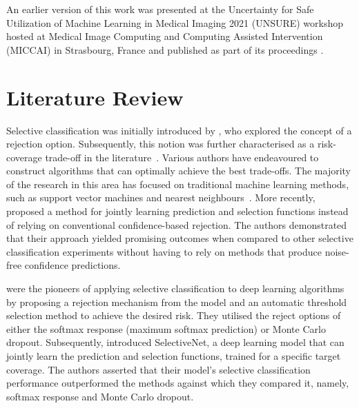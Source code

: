 An earlier version of this work was presented at the Uncertainty for Safe Utilization of Machine Learning in Medical Imaging 2021 (UNSURE) workshop hosted at Medical Image Computing and Computing Assisted Intervention (MICCAI) in Strasbourg, France and published as part of its proceedings \citep{carse2021robust}.



\section{Literature Review}
\label{sec:selective_review}
Selective classification was initially introduced by \cite{chow1957optimum}, who explored the concept of a rejection option. Subsequently, this notion was further characterised as a risk-coverage trade-off in the literature~\citep{el2010foundations}. Various authors have endeavoured to construct algorithms that can optimally achieve the best trade-offs. The majority of the research in this area has focused on traditional machine learning methods, such as support vector machines and nearest neighbours~\citep{hellman1970nearest,fumera2002support,wiener2015agnostic}. More recently, \cite{cortes2016learning} proposed a method for jointly learning prediction and selection functions instead of relying on conventional confidence-based rejection. The authors demonstrated that their approach yielded promising outcomes when compared to other selective classification experiments without having to rely on methods that produce noise-free confidence predictions.

\cite{geifman2017selective} were the pioneers of applying selective classification to deep learning algorithms by proposing a rejection mechanism from the model and an automatic threshold selection method to achieve the desired risk. They utilised the reject options of either the softmax response (maximum softmax prediction) or Monte Carlo dropout. Subsequently, \cite{geifman2019selectivenet} introduced SelectiveNet, a deep learning model that can jointly learn the prediction and selection functions, trained for a specific target coverage. The authors asserted that their model's selective classification performance outperformed the methods against which they compared it, namely, softmax response and Monte Carlo dropout.

